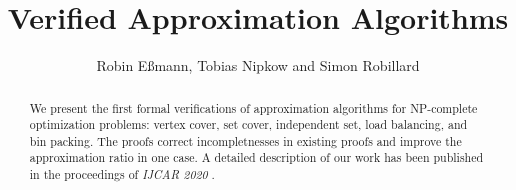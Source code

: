 \documentclass[11pt,a4paper]{article}
\begin{document}
\title{Verified Approximation Algorithms}
\author{Robin E{\ss}mann, Tobias Nipkow and Simon Robillard}
\maketitle

\begin{abstract}
We present the first formal verifications of approximation algorithms
for NP-complete optimization problems:
vertex cover, set cover, independent set, load balancing, and bin packing.
The proofs correct incompletnesses in existing proofs
and improve the approximation ratio in one case.
A detailed description of our work has been published in the proceedings of
\emph{IJCAR 2020} \cite{EssmannNR-IJCAR20}.
\end{abstract}

\tableofcontents





\end{document}
